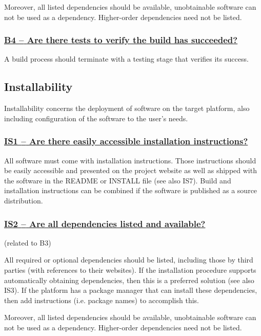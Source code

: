 \documentclass[a4paper,11pt]{article}
\newcommand{\indicator}[1]{\subsubsection*{\underline{#1}}}
\begin{document}
Moreover, all listed dependencies should be available, unobtainable software
can not be used as a dependency. Higher-order dependencies need not be listed.

\newcommand{\bFourName}{B4}
\newcommand{\bFourID}{\bFourName}
\newcommand{\bFourText}{Are there tests to verify the build has succeeded?}
\indicator{\bFourName{ }--{ }\bFourText}\label{id:b4} 

A build process should terminate with a testing stage that verifies its success.

\subsection{Installability}\label{sec:ins}

Installability concerns the deployment of software on the target platform, also
including configuration of the software to the user's needs.

\newcommand{\isOneName}{IS1}
\newcommand{\isOneID}{\isOneName}
\newcommand{\isOneText}{Are there easily accessible installation instructions?}
\indicator{\isOneName{ }--{ }\isOneText}\label{id:is1} 

All software must come with installation instructions. Those instructions should
be easily accessible and presented on the project website as well as shipped
with the software in the README or INSTALL file (see also IS7). Build and installation
instructions can be combined if the software is published as a source
distribution.

\newcommand{\isTwoName}{IS2}
\newcommand{\isTwoID}{\isTwoName}
\newcommand{\isTwoText}{Are all dependencies listed and available?}
\indicator{\isTwoName{ }--{ }\isTwoText}\label{id:is2} 
(related to B3)

All required or optional dependencies should be listed, including those by
third parties (with references to their websites). If the installation
procedure supports automatically obtaining dependencies, then this is a
preferred solution (see also IS3). If the platform has a package manager that
can install these dependencies, then add instructions (i.e. package names) to
accomplish this.

Moreover, all listed dependencies should be available, unobtainable software
can not be used as a dependency. Higher-order dependencies need not be listed.
%
%
\end{document}

